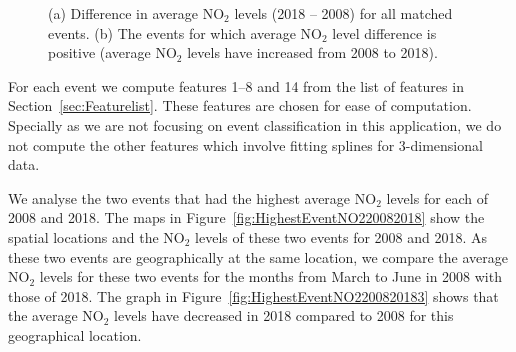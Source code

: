 \documentclass[a4paper,11pt]{article}
\begin{document}
\begin{figure}[!htb]
  \centering
  \caption{(a) Difference in average $\text{NO}_2$ levels (2018 -- 2008) for all matched events. (b) The events for which average $\text{NO}_2$ level difference is positive (average $\text{NO}_2$ levels have increased from 2008 to 2018).}
  \label{fig:DifferenceInNO2Levels}
\end{figure}

For each event we compute features 1--8 and 14 from the list of features in Section~\ref{sec:Featurelist}. These features are chosen for ease of computation. Specially as we are not focusing on event classification in this application, we do not compute the other features which involve fitting splines for 3-dimensional data.

We analyse the two events that had the highest average $\text{NO}_2$ levels for each of 2008 and 2018. The maps in Figure~\ref{fig:HighestEventNO220082018} show the spatial locations and the $\text{NO}_2$ levels of these two events for 2008 and 2018. As these two events are geographically at the same location, we compare the average  $\text{NO}_2$ levels for these two events for the months from March to June in 2008 with those of 2018. The graph in Figure~\ref{fig:HighestEventNO2200820183} shows that the average $\text{NO}_2$ levels have decreased in 2018 compared to 2008 for this geographical location.
\end{document}
